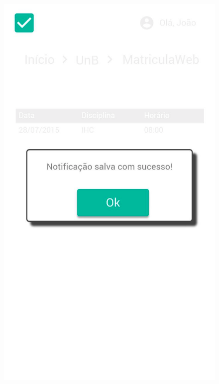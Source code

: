 \begin{figure}[h!]
{      \includegraphics[keepaspectratio=true, scale=0.2]{figuras/mob115.png}
   }
    
\end{figure}

